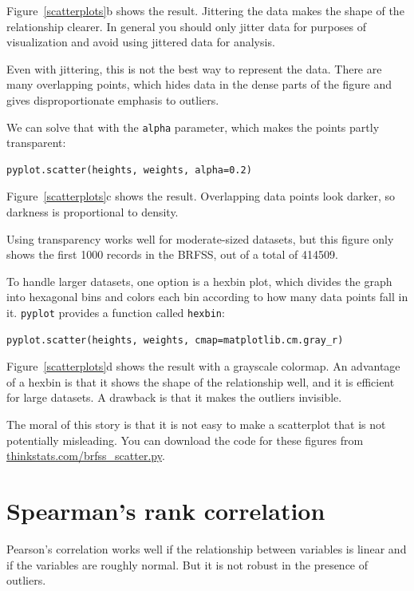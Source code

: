 \documentclass[12pt]{book}
\begin{document}
Figure~\ref{scatterplots}b shows the result.  Jittering the data makes
the shape of the relationship clearer.  In general you should only jitter
data for purposes of visualization and avoid using jittered data
for analysis.

Even with jittering, this is not the best way to represent the data.
There are many overlapping points, which hides data
in the dense parts of the figure and gives disproportionate emphasis
to outliers.


We can solve that with the {\tt alpha} parameter, which makes
the points partly transparent:
%
\begin{verbatim}
pyplot.scatter(heights, weights, alpha=0.2)
\end{verbatim}
%
Figure~\ref{scatterplots}c shows the result.  Overlapping data points
look darker, so darkness is proportional to density.

Using transparency works well for moderate-sized datasets, but this
figure only shows the first 1000 records in the BRFSS, out of a total
of 414509.


To handle larger datasets, one option is a hexbin plot, which divides
the graph into hexagonal bins and colors each bin according to how many
data points fall in it.  {\tt pyplot} provides a function called 
{\tt hexbin}:
%
\begin{verbatim}
pyplot.scatter(heights, weights, cmap=matplotlib.cm.gray_r)
\end{verbatim}
%
Figure~\ref{scatterplots}d shows the result with a grayscale colormap.
An advantage of a hexbin is that it shows the shape of the relationship
well, and it is efficient for large datasets.  A drawback is that
it makes the outliers invisible.


The moral of this story is that it is
not easy to make a scatterplot that is not potentially misleading.
You can download the code for these figures from
\url{thinkstats.com/brfss_scatter.py}.


\section{Spearman's rank correlation}

Pearson's correlation works well if the relationship between variables
is linear and if the variables are roughly normal.  But it is not
robust in the presence of outliers.
\end{document}
